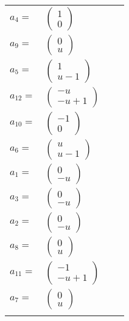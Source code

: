 \documentclass[1p]{elsarticle_modified}
\theoremstyle{definition}
\begin{document}
\begin{tabular}{m{7pt} m{180pt} m{7pt} m{180pt} }
\flushright $a_{4}=$&$\begin{pmatrix}1\\0\end{pmatrix}$ \\
\flushright $a_{9}=$&$\begin{pmatrix}0\\u\end{pmatrix}$ \\
\flushright $a_{5}=$&$\begin{pmatrix}1\\u-1\end{pmatrix}$ \\
\flushright $a_{12}=$&$\begin{pmatrix}- u\\- u+1\end{pmatrix}$ \\
\flushright $a_{10}=$&$\begin{pmatrix}-1\\0\end{pmatrix}$ \\
\flushright $a_{6}=$&$\begin{pmatrix}u\\u-1\end{pmatrix}$ \\
\flushright $a_{1}=$&$\begin{pmatrix}0\\- u\end{pmatrix}$ \\
\flushright $a_{3}=$&$\begin{pmatrix}0\\- u\end{pmatrix}$ \\
\flushright $a_{2}=$&$\begin{pmatrix}0\\- u\end{pmatrix}$ \\
\flushright $a_{8}=$&$\begin{pmatrix}0\\u\end{pmatrix}$ \\
\flushright $a_{11}=$&$\begin{pmatrix}-1\\- u+1\end{pmatrix}$ \\
\flushright $a_{7}=$&$\begin{pmatrix}0\\u\end{pmatrix}$\\&\end{tabular}
\end{document}

